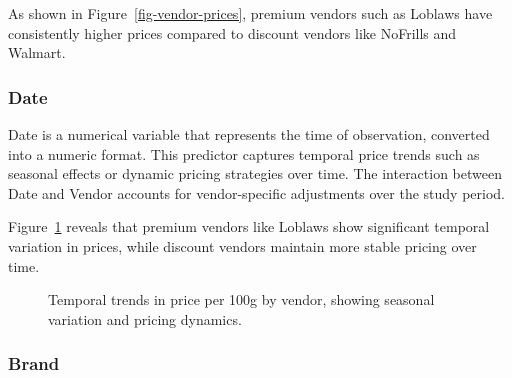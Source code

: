 \documentclass[
  letterpaper,
  DIV=11,
  numbers=noendperiod]{scrartcl}
\begin{document}
As shown in Figure~\ref{fig-vendor-prices}, premium vendors such as
Loblaws have consistently higher prices compared to discount vendors
like NoFrills and Walmart.

\subsubsection{Date}\label{date}

Date is a numerical variable that represents the time of observation,
converted into a numeric format. This predictor captures temporal price
trends such as seasonal effects or dynamic pricing strategies over time.
The interaction between Date and Vendor accounts for vendor-specific
adjustments over the study period.

Figure~\ref{fig-temporal-trends} reveals that premium vendors like
Loblaws show significant temporal variation in prices, while discount
vendors maintain more stable pricing over time.

\begin{figure}[H]


\caption{\label{fig-temporal-trends}Temporal trends in price per 100g by
vendor, showing seasonal variation and pricing dynamics.}

\end{figure}%

\subsubsection{Brand}\label{brand}
\end{document}
